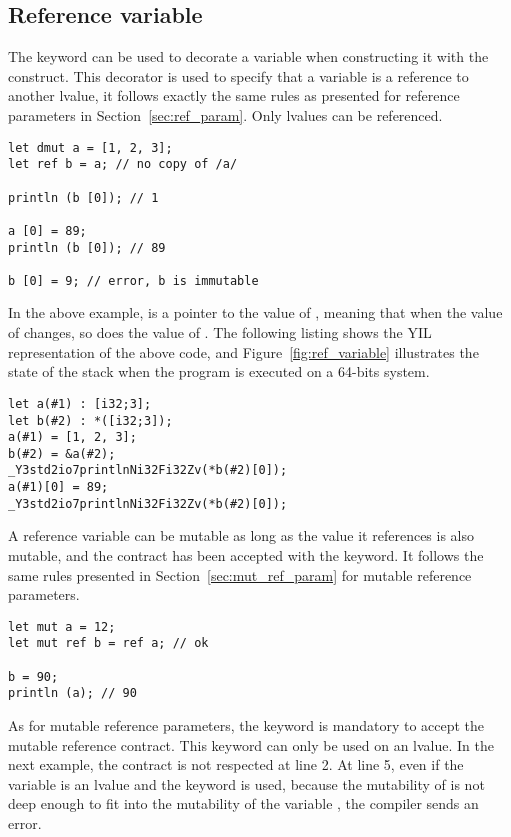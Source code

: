 \subsection{Reference variable}

The  keyword can be used to decorate a variable when constructing it
with the  construct. This decorator is used to specify that a
variable is a reference to another lvalue, it follows exactly the same rules as
presented for reference parameters in Section~\ref{sec:ref_param}. Only lvalues
can be referenced.

\begin{lstlisting}[style=coloredverbatim]
let dmut a = [1, 2, 3];
let ref b = a; // no copy of /a/

println (b [0]); // 1

a [0] = 89;
println (b [0]); // 89

b [0] = 9; // error, b is immutable
\end{lstlisting}

In the above example,  is a pointer to the value of ,
meaning that when the value of  changes, so does the value of
. The following listing shows the YIL representation of the above
code, and Figure~\ref{fig:ref_variable} illustrates the state of the stack when the
program is executed on a 64-bits system.

\begin{lstlisting}[style=intermediateVerb]
let a(#1) : [i32;3];
let b(#2) : *([i32;3]);
a(#1) = [1, 2, 3];
b(#2) = &a(#2);
_Y3std2io7printlnNi32Fi32Zv(*b(#2)[0]);
a(#1)[0] = 89;
_Y3std2io7printlnNi32Fi32Zv(*b(#2)[0]);
\end{lstlisting}



A reference variable can be mutable as long as the value it references is also
mutable, and the contract has been accepted with the  keyword. It
follows the same rules presented in Section~\ref{sec:mut_ref_param} for mutable
reference parameters.

\begin{lstlisting}[style=coloredverbatim]
let mut a = 12;
let mut ref b = ref a; // ok

b = 90;
println (a); // 90
\end{lstlisting}

As for mutable reference parameters, the keyword  is mandatory to
accept the mutable reference contract. This keyword can only be used on an
lvalue. In the next example, the contract is not respected at line 2. At line 5,
even if the variable is an lvalue and the keyword  is used, because
the mutability of  is not deep enough to fit into the mutability of
the variable , the compiler sends an error.

